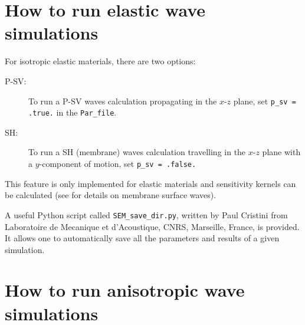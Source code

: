 \documentclass[oneside,english,onecolumn,letterpaper]{book}
\begin{document}
\section{How to run elastic wave simulations}

For isotropic elastic materials, there are two options:
%
\begin{description}
\item[P-SV:]
To run a P-SV waves calculation propagating in the $x$-$z$ plane,
set \texttt{p\_sv = .true.} in the \texttt{Par\_file}.

\item[SH:]
To run a SH (membrane) waves calculation travelling in the $x$-$z$ plane with a
$y$-component of motion, set \texttt{p\_sv = .false.}

\end{description}
%
This feature is only implemented for elastic materials and sensitivity kernels
can be calculated (see \cite{TaLiTr07} for details on membrane
surface waves).

A useful Python script called \texttt{SEM\_save\_dir.py}, written by Paul Cristini from
Laboratoire de Mecanique et d'Acoustique, CNRS, Marseille, France, is provided.
It allows one to automatically save all the parameters and results of a given simulation.

\section{How to run anisotropic wave simulations}
\end{document}
